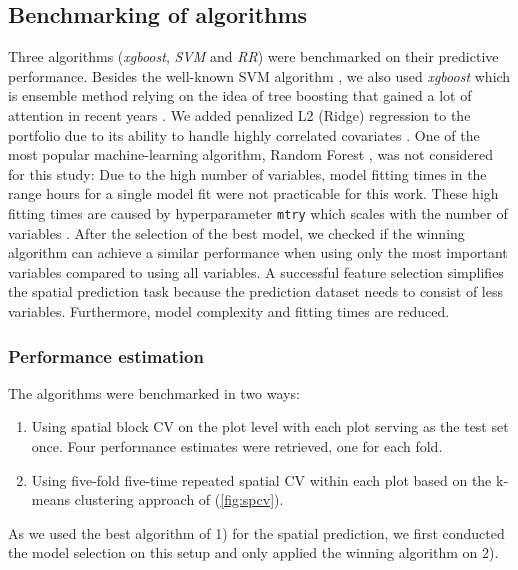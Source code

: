 \documentclass[review]{elsarticle}
\begin{document}
\subsection{Benchmarking of algorithms}

\noindent Three algorithms (\textit{xgboost}, \textit{\ac{SVM}} and \textit{\ac{RR}}) were benchmarked on their predictive performance.
Besides the well-known \ac{SVM} algorithm \citep{Vapnik1998}, we also used \textit{xgboost} which is ensemble method relying on the idea of tree boosting that gained a lot of attention in recent years \citep{chenXGBoostScalableTree2016}.
We added penalized L2 (Ridge) regression to the portfolio due to its ability to handle highly correlated covariates \citep{hoerlRidgeRegressionBiased1970}.
One of the most popular machine-learning algorithm, Random Forest \citep{Breiman2001}, was not considered for this study: Due to the high number of variables, model fitting times in the range hours for a single model fit were not practicable for this work.
These high fitting times are caused by hyperparameter \texttt{mtry} which scales with the number of variables \citep{Probst2018b}.
After the selection of the best model, we checked if the winning algorithm can achieve a similar performance when using only the most important variables compared to using all variables.
A successful feature selection simplifies the spatial prediction task because the prediction dataset needs to consist of less variables.
Furthermore, model complexity and fitting times are reduced.

\subsubsection{Performance estimation}

\noindent The algorithms were benchmarked in two ways:

\begin{enumerate}
	\item Using spatial block \ac{CV} on the plot level with each plot serving as the test set once. Four performance estimates were retrieved, one for each fold.
	\item Using five-fold five-time repeated spatial \ac{CV} within each plot based on the k-means clustering approach of \cite{sperrorest} (\autoref{fig:spcv}).
\end{enumerate}

\noindent As we used the best algorithm of 1) for the spatial prediction, we first conducted the model selection on this setup and only applied the winning algorithm on 2).
\end{document}
